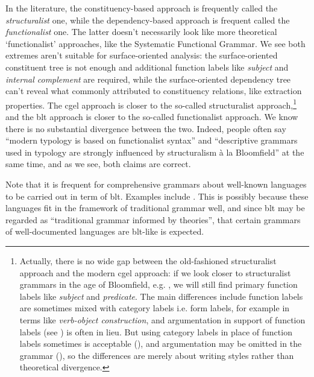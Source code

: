 \documentclass[UTF8, a4paper, oneside, scheme=plain]{ctexart}
\newcommand*{\term}[1]{\emph{#1}}
\newcommand{\ala}{à la}
\begin{document}
In the literature, the constituency-based approach is frequently called the \emph{structuralist} one,
while the dependency-based approach is frequent called the \emph{functionalist} one.
The latter doesn't necessarily look like more theoretical `functionalist' approaches,
like the Systematic Functional Grammar.
We see both extremes aren't suitable for surface-oriented analysis:
the surface-oriented constituent tree is not enough
and additional function labels like \term{subject} and \term{internal complement}
are required,
while the surface-oriented dependency tree 
can't reveal what commonly attributed to constituency relations,
like extraction properties.
The \ac{cgel} approach is closer to the so-called structuralist approach,\footnote{
    Actually, there is no wide gap between the old-fashioned structuralist approach 
    and the modern \ac{cgel} approach:
    if we look closer to structuralist grammars in the age of Bloomfield,
    e.g. \citet{chao1965grammar},
    we will still find primary function labels like \term{subject} and \term{predicate}.
    The main differences include function labels are sometimes mixed with category labels i.e. form labels,
    for example in terms like \term{verb-object construction},
    and argumentation in support of function labels (see )
    is often in lieu.
    But using category labels in place of function labels sometimes is acceptable 
    (),
    and argumentation may be omitted in the grammar (),
    so the differences are merely about writing styles rather than theoretical divergence.
}
and the \ac{blt} approach is closer to the so-called functionalist approach.
We know there is no substantial divergence between the two.
Indeed, people often say 
``modern typology is based on functionalist syntax''
and ``descriptive grammars used in typology are strongly influenced by structuralism \ala{} Bloomfield''
at the same time,
and as we see, both claims are correct.

Note that it is frequent 
for comprehensive grammars about well-known languages to be carried out in term of \ac{blt}.
Examples include \cite{batchelor2010reference,batchelor2011reference}.
This is possibly because these languages fit in the framework of traditional grammar well,
and since \ac{blt} may be regarded as ``traditional grammar informed by theories'',
that certain grammars of well-documented languages are \ac{blt}-like is expected.
\end{document}
